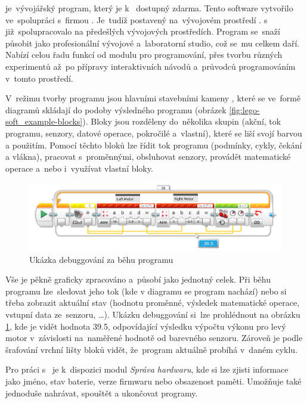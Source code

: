 \legoSW{} je~vývojářský program, který je k~\EVthree{} dostupný zdarma. 
Tento  software vytvořilo \lego{} ve~spolupráci s~firmou \NI{}. 
Je~tudíž postavený na~vývojovém prostředí \labview{}. 
\lego{} s~\NI{} již~spolupracovalo na předešlých vývojových prostředích. %
Program se~snaží působit jako profesionální vývojové a~laboratorní studio, což se~mu celkem daří.
Nabízí celou řadu funkcí od modulu pro programování, přes tvorbu různých experimentů až~po přípravy interaktivních návodů a~průvodců programováním v~tomto prostředí.

V~režimu tvorby programu jsou hlavními stavebními kameny \EVblocks, které se ve~formě diagramů skládají do podoby výsledného programu (obrázek \ref{fig:lego-soft_example-blocks}).
Bloky jsou rozděleny do~několika skupin (akční, tok programu, senzory, datové operace, pokročilé a~vlastní), které se liší svojí barvou a použitím. 
Pomocí těchto bloků lze řídit tok programu (podmínky, cykly, čekání a vlákna), pracovat s~proměnnými, obsluhovat senzory, provádět matematické operace a~nebo i~využívat vlastní bloky.

\begin{figure}[h]
	\centering
	\includegraphics[width=\textwidth]{images/lego-soft/lego-soft_live-debugging_line-advance.png}
	\caption{Ukázka debuggování za běhu programu}
	\label{fig:lego-soft_live-debugging_line-advance}
\end{figure}

Vše je pěkně graficky zpracováno a~působí jako jednotný celek. 
Při běhu programu lze~sledovat jeho tok (kde v diagramu se program nachází) nebo si třeba zobrazit aktuální stav (hodnotu proměnné, výsledek matematické operace, vstupní data ze~senzoru, \dots). 
Ukázku debuggování si~lze prohlédnout na obrázku \ref{fig:lego-soft_live-debugging_line-advance}, kde je vidět hodnota 39.5, odpovídající výsledku výpočtu výkonu pro levý motor v~závislosti na~naměřené hodnotě od barevného senzoru.
Zároveň je podle šrafování vrchní lišty bloků vidět, že~program aktuálně probíhá v~daném cyklu.

Pro práci s~ je k~dispozici modul {\it Správa hardwaru}, kde si lze zjisti informace jako jméno, stav baterie, verze firmwaru nebo obsazenost paměti. 
Umožňuje také jednoduše nahrávat, spouštět a ukončovat programy. 

